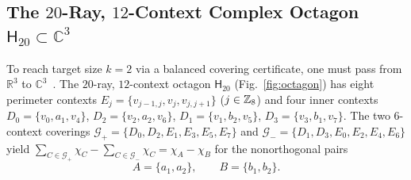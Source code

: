 \documentclass[aps,pra,reprint,superscriptaddress,longbibliography,nofootinbib,floatfix,10pt]{revtex4-2}
\theoremstyle{definition}\newtheorem{definition}[theorem]{Definition}
\theoremstyle{remark}\newtheorem{remark}[theorem]{Remark}
\newcommand{\C}{\mathbb C}\newcommand{\R}{\mathbb R}\newcommand{\Q}{\mathbb Q}
\newcommand{\Htwenty}{\mathsf H_{20}}
\begin{document}
\subsection{The \texorpdfstring{$20$}{20}-Ray, \texorpdfstring{$12$}{12}-Context Complex Octagon \texorpdfstring{$\Htwenty\subset\C^3$}{H20 in C3}}\label{sec:octagon}

To reach target size $k=2$ via a balanced covering certificate, one must pass from $\R^3$ to $\C^3$~\cite{2026-Navara-Svozil-pseudocontexts,2026-Navara-Svozil-complex-only-3d-hypergraphs}. The $20$-ray, $12$-context octagon $\Htwenty$ (Fig.~\ref{fig:octagon}) has eight perimeter contexts $E_j=\{v_{j-1,j},v_j,v_{j,j+1}\}$ ($j\in\mathbb Z_8$) and four inner contexts $D_0=\{v_0,a_1,v_4\}$, $D_2=\{v_2,a_2,v_6\}$, $D_1=\{v_1,b_2,v_5\}$, $D_3=\{v_3,b_1,v_7\}$. The two $6$-context coverings $\mathcal{G}_+=\{D_0,D_2,E_1,E_3,E_5,E_7\}$ and $\mathcal{G}_-=\{D_1,D_3,E_0,E_2,E_4,E_6\}$ yield $\sum_{C\in\mathcal{G}_+}\chi_C-\sum_{C\in\mathcal{G}_-}\chi_C=\chi_A-\chi_B$ for the nonorthogonal pairs
\begin{equation}\label{eq:octagon-targets}
A=\{a_1,a_2\},\qquad B=\{b_1,b_2\}.
\end{equation}
\end{document}
